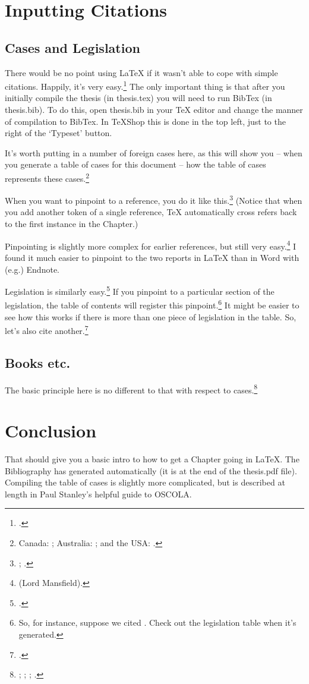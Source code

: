 \section{Inputting Citations}
\subsection{Cases and Legislation}
There would be no point using LaTeX if it wasn't able to cope with simple citations. Happily, it's very easy.\footnote{\cite{achilleas}.} The only important thing is that after you initially compile the thesis (in thesis.tex) you will need to run BibTex (in thesis.bib). To do this, open thesis.bib in your TeX editor and change the manner of compilation to BibTex. In TeXShop this is done in the top left, just to the right of the `Typeset' button. 

It's worth putting in a number of foreign cases here, as this will show you -- when you generate a table of cases for this document -- how the table of cases represents these cases.\footnote{Canada: \cite{deglman}; Australia: \cite{roxborough}; and the USA: \cite{boomer}.}

When you want to pinpoint to a reference, you do it like this.\footnote{\cite[10]{achilleas}; \cite[10]{benedettisc}.} (Notice that when you add another token of a single reference, TeX automatically cross refers back to the first instance in the Chapter.)

Pinpointing is slightly more complex for earlier references, but still very easy.\footnote{\cite[1012|680--81]{moses} (Lord Mansfield).} I found it much easier to pinpoint to the two reports in LaTeX than in Word with (e.g.) Endnote. 

Legislation is similarly easy.\footnote{\cite{sga}.} If you pinpoint to a particular section of the legislation, the table of contents will register this pinpoint.\footnote{So, for instance, suppose we cited \cite[12]{sga}. Check out the legislation table when it's generated.} It might be easier to see how this works if there is more than one piece of legislation in the table. So, let's also cite another.\footnote{\cite{frustrated}.}

\subsection{Books etc.}
The basic principle here is no different to that with respect to cases.\footnote{\cite{stevens08}; \cite{stevens}; \cite{defeaters}; \cite{reynolds63}.}

\section{Conclusion}
That should give you a basic intro to how to get a Chapter going in LaTeX. The Bibliography has generated automatically (it is at the end of the thesis.pdf file). Compiling the table of cases is slightly more complicated, but is described at length in Paul Stanley's helpful guide to OSCOLA. 